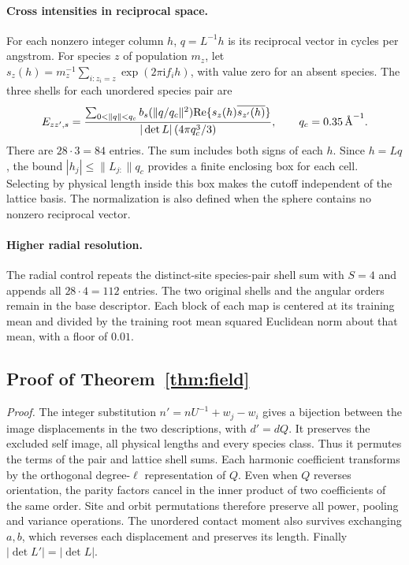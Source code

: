 \paragraph{Cross intensities in reciprocal space.}
For each nonzero integer column \(h\), \(q=L^{-1}h\) is its reciprocal vector in cycles per angstrom. For species \(z\) of population \(m_z\), let \(s_z(h)=m_z^{-1}\sum_{i:z_i=z}\exp(2\pi\mathrm{i} f_i h)\), with value zero for an absent species. The three shells for each unordered species pair are
\[
 E_{zz',s}=\frac{\sum_{0<\|q\|<q_c} b_s(\|q/q_c\|^2)
             {\rm Re}\{s_z(h)\overline{s_{z'}(h)}\}}
             {|\det L|\,(4\pi q_c^3/3)},\qquad q_c=0.35\,\text{\AA}^{-1}.
\]
There are \(28\cdot3=84\) entries. The sum includes both signs of each \(h\). Since \(h=Lq\), the bound \(|h_j|\leq\|L_{j:}\|q_c\) provides a finite enclosing box for each cell. Selecting by physical length inside this box makes the cutoff independent of the lattice basis. The normalization is also defined when the sphere contains no nonzero reciprocal vector.

\paragraph{Higher radial resolution.}
The radial control repeats the distinct-site species-pair shell sum with \(S=4\) and appends all \(28\cdot4=112\) entries. The two original shells and the angular orders remain in the base descriptor. Each block of each map is centered at its training mean and divided by the training root mean squared Euclidean norm about that mean, with a floor of \(0.01\).

\subsection{Proof of Theorem~\ref{thm:field}}\label{app:field-proof}
\emph{Proof.} The integer substitution \(n'=nU^{-1}+w_j-w_i\) gives a bijection between the image displacements in the two descriptions, with \(d'=dQ\). It preserves the excluded self image, all physical lengths and every species class. Thus it permutes the terms of the pair and lattice shell sums. Each harmonic coefficient transforms by the orthogonal degree-\(\ell\) representation of \(Q\). Even when \(Q\) reverses orientation, the parity factors cancel in the inner product of two coefficients of the same order. Site and orbit permutations therefore preserve all power, pooling and variance operations. The unordered contact moment also survives exchanging \(a,b\), which reverses each displacement and preserves its length. Finally \(|\det L'|=|\det L|\).

